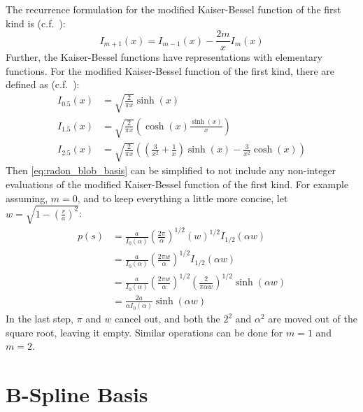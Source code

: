 The recurrence formulation for the modified Kaiser-Bessel function of the first kind is
(c.f.~\cite[Chapter~9]{abramowitz_handbook_1972}):
\begin{equation}\label{eq:kaiser_bessel_recurrence}
	I_{m+1}(x) = I_{m-1}(x) - \frac{2 m}{x}I_m(x)
\end{equation}
Further, the Kaiser-Bessel functions have representations with elementary functions. For the
modified Kaiser-Bessel function of the first kind, there are defined as (c.f.~\cite[Chapter~10]{abramowitz_handbook_1972}):
\begin{align}\label{eq:kaiser_bessel_half_integer}
	I_{0.5}(x) & = \sqrt{\frac{2}{\pi x}} \sinh(x)                                                                               \\
	I_{1.5}(x) & = \sqrt{\frac{2}{\pi x}} \left( \cosh(x) \frac{\sinh(x)}{x} \right)                                             \\
	I_{2.5}(x) & = \sqrt{\frac{2}{\pi x}} \left(\left(\frac{3}{x^2} + \frac{1}{x}\right)\sinh(x) - \frac{3}{x^2} \cosh(x)\right)
\end{align}
Then \autoref{eq:radon_blob_basis} can be simplified to not include any non-integer evaluations of
the modified Kaiser-Bessel function of the first kind. For example assuming, \(m = 0\), and to keep
everything a little more concise, let \(w = \sqrt{1 - \left(\frac{r}{a}\right)^2}\):
\begin{align}\label{eq:radon_blob_basis_order_0_simplified}
	p(s) & = \frac{a}{I_0(\alpha)} \left(\frac{2\pi}{\alpha}\right)^{1/2} \left( w \right)^{1/2} I_{1/2}\left( \alpha w \right)                     \\
	     & = \frac{a}{I_0(\alpha)} \left(\frac{2\pi w}{\alpha}\right)^{1/2} I_{1/2}\left( \alpha w \right)                                          \\
	     & = \frac{a}{I_0(\alpha)} \left(\frac{2\pi w}{\alpha}\right)^{1/2} \left( \frac{2}{\pi \alpha w}\right)^{1/2} \sinh \left(\alpha w \right) \\
	     & = \frac{2 a}{\alpha I_0(\alpha)} \sinh \left(\alpha w \right)
\end{align}
In the last step, \(\pi\) and \(w\) cancel out, and both the \(2^2\) and \(\alpha^2\) are moved out
of the square root, leaving it empty. Similar operations can be done for \(m = 1\) and \(m = 2\).

\section{B-Spline Basis}\label{sec:bspline_basis}


